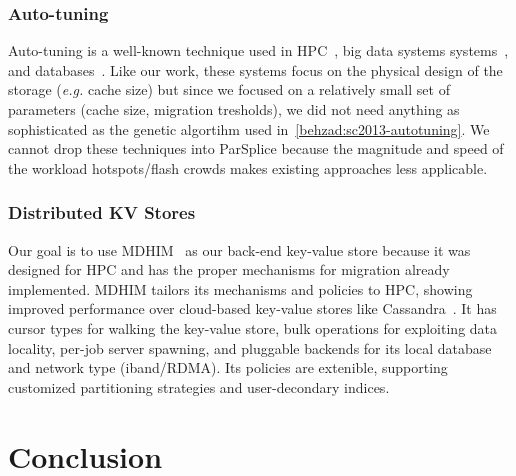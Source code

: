 \subsubsection*{Auto-tuning} Auto-tuning is a well-known technique used in
HPC~\cite{behzad:sc2013-autotuning, behzad:techreport2014-io-autotuning}, big
data systems systems~\cite{herodotou_starfish_2011}, and
databases~\cite{schnaitter_index_2009}.  Like our work, these systems focus on
the physical design of the storage ({\it e.g.} cache size) but since we focused
on a relatively small set of parameters (cache size, migration tresholds), we
did not need anything as sophisticated as the genetic algortihm used
in~\ref{behzad:sc2013-autotuning}.  We cannot drop these techniques into
ParSplice because the magnitude and speed of the workload hotspots/flash crowds
makes existing approaches less applicable. 

\subsubsection*{Distributed KV Stores}

Our goal is to use MDHIM~\cite{greenberg:hotstorage2015-mdhim} as our back-end
key-value store because it was designed for HPC and has the proper mechanisms
for migration already implemented.  MDHIM tailors its mechanisms and policies
to HPC, showing improved performance over cloud-based key-value stores like
Cassandra~\cite{lakshman_cassandra_2010}. It has cursor types for walking the
key-value store, bulk operations for exploiting data locality, per-job server
spawning, and pluggable backends for its local database and network type
(iband/RDMA). Its policies are extenible, supporting customized partitioning
strategies and user-decondary indices.



\section{Conclusion}
